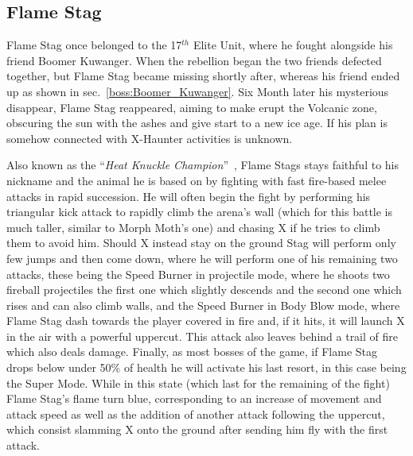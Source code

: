 \subsection{Flame Stag}\label{boss:Flame_stag}

Flame Stag once belonged to the 17$^{th}$ Elite Unit, where he fought alongside his friend Boomer Kuwanger.  When the rebellion began the two friends defected together, but Flame Stag became missing shortly after, whereas his friend ended up as shown in sec.~\ref{boss:Boomer_Kuwanger}. Six Month later his mysterious disappear, Flame Stag reappeared, aiming to make erupt the Volcanic zone, obscuring the sun with the ashes and give start to a new ice age. If his plan is somehow connected with X-Haunter activities is unknown.

Also known as the ``\textit{Heat Knuckle Champion}''~\cite{book:MMX_Complete_art}, Flame Stags stays faithful to his nickname and the animal he is based on by fighting with fast fire-based melee attacks in rapid succession. He will often begin the fight by performing his triangular kick attack to rapidly climb the arena's wall (which for this battle is much taller, similar to Morph Moth's one) and chasing X if he tries to climb them to avoid him. Should X instead stay on the ground Stag will perform only few jumps and then come down, where he will perform one of his remaining two attacks, these being the Speed Burner in projectile mode, where he shoots two fireball projectiles the first one which slightly descends and the second one which rises and can also climb walls, and the Speed Burner in Body Blow mode, where Flame Stag dash towards the player covered in fire and, if it hits, it will launch X in the air with a powerful uppercut. This attack also leaves behind a trail of fire which also deals damage. Finally, as most bosses of the game, if Flame Stag drops below under 50\% of health he will activate his last resort, in this case being the Super Mode. While in this state (which last for the remaining of the fight) Flame Stag's flame turn blue, corresponding to an increase of movement and attack speed as well as the addition of another attack following the uppercut, which consist slamming X onto the ground after sending him fly with the first attack.

